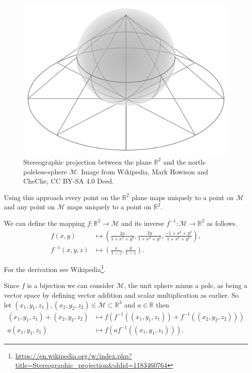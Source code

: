 \documentclass[10pt, a4paper]{article}
\def\R{\mathbb{R}}
\def\f{f}
\def\finv{f^{-1}}
\theoremstyle{break}
\begin{document}
\begin{figure}[h!]
\centering
\includegraphics[width=0.5\linewidth]{./figures/stereoproj.pdf}
\caption[Stereographic projection]{Stereographic projection between the plane $\R^2$ and the north-poleless-sphere $\mathscr{M}$. Image from Wikipedia, Mark Howison and CheChe, CC BY-SA 4.0 Deed\footnotemark[1].}
\label{fig:stereoproj}
\end{figure}


Using this approach every point on the $\R^2$ plane maps uniquely to a point on $\mathscr{M}$ and any point on $\mathscr{M}$ maps uniquely to a point on $\R^2$.

We can define the mapping $\f : \R^2 \to \mathscr{M}$ and its inverse $\finv : \mathscr{M} \to \R^2$ as follows.
\begin{align*}
\f (x, y) & \mapsto \left( \frac{2x}{1 + x^2 + y^2}, \frac{2y}{1 + x^2 + y^2}, \frac{-1 + x^2 + y^2}{1 + x^2 + y^2} \right), \\
\finv (x, y, z) & \mapsto \left( \frac{x}{1 - z}, \frac{y}{1 - z} \right).
\end{align*}

For the derivation see Wikipedia\footnote[2]{\url{https://en.wikipedia.org/w/index.php?title=Stereographic_projection&oldid=1183460764}}.

Since $\f$ is a bijection we can consider $\mathscr{M}$, the unit sphere minus a pole, as being a vector space by defining vector addition and scalar multiplication as earlier. So let $(x_1, y_1, z_1), (x_2, y_2, z_2) \in \mathscr{M} \subset \R^3$ and $a \in \R$ then
\begin{align*}
(x_1, y_1, z_1) + (x_2, y_2, z_2) & \mapsto \f( \finv((x_1, y_1, z_1)) + \finv((x_2, y_2, z_2))) \\
a (x_1, y_1, z_1) & \mapsto \f( a \finv ((x_1, y_1, z_1))).
\end{align*}
\end{document}
